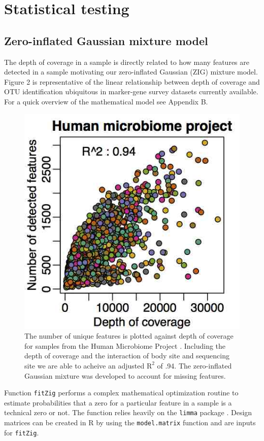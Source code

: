 \documentclass[a4paper,11pt]{article}\usepackage[]{graphicx}\usepackage[]{color}
\begin{document}
\newpage
\section{Statistical testing}

\subsection{Zero-inflated Gaussian mixture model}
The depth of coverage in a sample is directly related to how many features are detected in a sample motivating our zero-inflated Gaussian (ZIG) mixture model. Figure 2 is representative of the linear relationship between depth of coverage and OTU identification ubiquitous in marker-gene survey datasets currently available. For a quick overview of the mathematical model see Appendix B.

\begin{figure}
\centerline{\includegraphics[width=.55\textwidth]{metagenomeSeq_figure1.png}}
\caption{\footnotesize{The number of unique features is plotted against depth of coverage for samples from the Human Microbiome Project \cite{hmp}. Including the depth of coverage and the interaction of body site and sequencing site we are able to acheive an adjusted $\mathrm{R}^2$ of .94. The zero-inflated Gaussian mixture was developed to account for missing features.}}\label{fig1}
\end{figure}

Function \texttt{fitZig} performs a complex mathematical optimization routine to estimate probabilities that a zero for a particular feature in a sample is a technical zero or not. The function relies heavily on the \texttt{limma} package \cite{limma}. Design matrices can be created in R by using the \texttt{model.matrix} function and are inputs for \texttt{fitZig}. 
\end{document}
